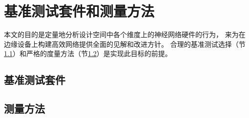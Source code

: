 \section{基准测试套件和测量方法}
\label{methodology}
本文的目的是定量地分析设计空间中各个维度上的神经网络硬件的行为，
来为在边缘设备上构建高效网络提供全面的见解和改进方针。
合理的基准测试选择（节\ref{suite}）和严格的度量方法（节\ref{measurement}）是实现此目标的前提。

\subsection{基准测试套件}
\label{suite}

\subsection{测量方法}
\label{measurement}